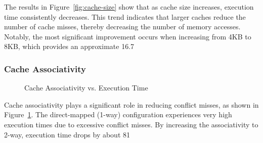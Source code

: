 \documentclass[a4paper,12pt]{article}
\begin{document}
The results in Figure~\ref{fig:cache-size} show that as cache size increases, execution time consistently decreases. This trend indicates that larger caches reduce the number of cache misses, thereby decreasing the number of memory accesses. Notably, the most significant improvement occurs when increasing from 4KB to 8KB, which provides an approximate 16.7%

\subsubsection{Cache Associativity}

\begin{figure}[htbp] \centering {} \caption{Cache Associativity vs. Execution Time} \label{fig:cache-assoc} \end{figure}

Cache associativity plays a significant role in reducing conflict misses, as shown in Figure~\ref{fig:cache-assoc}. The direct-mapped (1-way) configuration experiences very high execution times due to excessive conflict misses. By increasing the associativity to 2-way, execution time drops by about 81%
\end{document}
